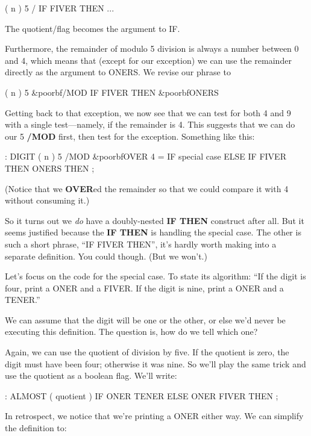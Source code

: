 \begin{Code}
( n )  5 / IF FIVER THEN ...
\end{Code}
The quotient/flag becomes the argument to IF.

Furthermore, the remainder of modulo 5 division is always a
number between 0 and 4, which means that (except for our exception) we
can use the remainder directly as the argument to ONERS. We revise our
phrase to

\begin{Code}[commandchars=\&\{\}]
( n )  5 &poorbf{/MOD} IF FIVER THEN  &poorbf{ONERS}
\end{Code}
Getting back to that exception, we now see that we can test for both 4
and 9 with a single test---namely, if the remainder is 4. This suggests that
we can do our 5 \textbf{/MOD} first, then test for the exception. Something like
this:

\begin{Code}[commandchars=\&\{\}]
: DIGIT  ( n )
     5 /MOD  &poorbf{OVER 4 =  IF  special case  ELSE}
     IF FIVER THEN  ONERS  THEN ;
\end{Code}
(Notice that we \textbf{OVER}ed the remainder so that we could compare it with
4 without consuming it.)

So it turns out we \emph{do} have a doubly-nested \textbf{IF THEN} construct
after all. But it seems justified because the \textbf{IF THEN} is handling the
special case. The other is such a short phrase, ``IF FIVER THEN'', it's
hardly worth making into a separate definition. You could though. (But we
won't.)

Let's focus on the code for the special case. To state its algorithm:
``If the digit is four, print a ONER and a FIVER. If the digit is nine, print
a ONER and a TENER.''

We can assume that the digit will be one or the other, or else we'd
never be executing this definition. The question is, how do we tell which
one?

Again, we can use the quotient of division by five. If the quotient is
zero, the digit must have been four; otherwise it was nine. So we'll play
the same trick and use the quotient as a boolean flag. We'll write:

\begin{Code}
: ALMOST  ( quotient )
     IF  ONER TENER  ELSE  ONER FIVER  THEN ;
\end{Code}
In retrospect, we notice that we're printing a ONER either way. We can
simplify the definition to:

